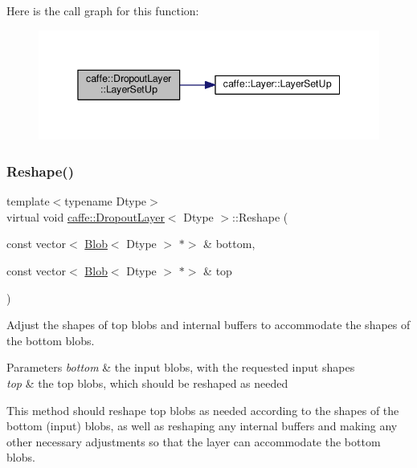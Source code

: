 Here is the call graph for this function\+:
\nopagebreak
\begin{figure}[H]
\begin{center}
\leavevmode
\includegraphics[width=345pt]{classcaffe_1_1_dropout_layer_addcfd0822c1c5e3591bc7001a034b167_cgraph}
\end{center}
\end{figure}
\mbox{\label{classcaffe_1_1_dropout_layer_a93f66d83b510987fe37a42d14e6ff98a}} 
\subsubsection{\texorpdfstring{Reshape()}{Reshape()}\hspace{0.1cm}{\footnotesize\ttfamily [1/2]}}
{\footnotesize\ttfamily template$<$typename Dtype$>$ \\
virtual void \mbox{\hyperlink{classcaffe_1_1_dropout_layer}{caffe\+::\+Dropout\+Layer}}$<$ Dtype $>$\+::Reshape (\begin{DoxyParamCaption}\item[{const vector$<$ \mbox{\hyperlink{classcaffe_1_1_blob}{Blob}}$<$ Dtype $>$ $\ast$$>$ \&}]{bottom,  }\item[{const vector$<$ \mbox{\hyperlink{classcaffe_1_1_blob}{Blob}}$<$ Dtype $>$ $\ast$$>$ \&}]{top }\end{DoxyParamCaption})\hspace{0.3cm}{\ttfamily [virtual]}}



Adjust the shapes of top blobs and internal buffers to accommodate the shapes of the bottom blobs. 


\begin{DoxyParams}{Parameters}
{\em bottom} & the input blobs, with the requested input shapes \\
\hline
{\em top} & the top blobs, which should be reshaped as needed\\
\hline
\end{DoxyParams}
This method should reshape top blobs as needed according to the shapes of the bottom (input) blobs, as well as reshaping any internal buffers and making any other necessary adjustments so that the layer can accommodate the bottom blobs. 

